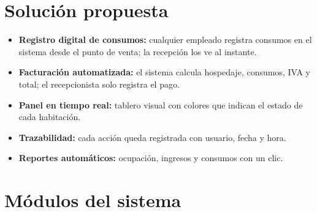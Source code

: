 \documentclass[12pt,a4paper]{article}
\begin{document}
\section{Solución propuesta}

\begin{itemize}[leftmargin=*]
    \item \textbf{Registro digital de consumos:} cualquier empleado registra consumos en el sistema desde el punto de venta; la recepción los ve al instante.
    \item \textbf{Facturación automatizada:} el sistema calcula hospedaje, consumos, IVA y total; el recepcionista solo registra el pago.
    \item \textbf{Panel en tiempo real:} tablero visual con colores que indican el estado de cada habitación.
    \item \textbf{Trazabilidad:} cada acción queda registrada con usuario, fecha y hora.
    \item \textbf{Reportes automáticos:} ocupación, ingresos y consumos con un clic.
\end{itemize}

\section{Módulos del sistema}
\end{document}
